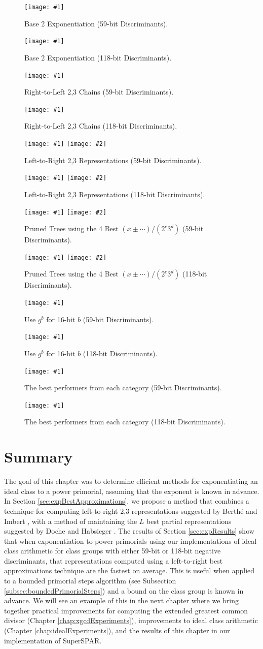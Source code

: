 \documentclass{ucalgthes1}
\theoremstyle{definition}
\newcommand{\mygraph}[3]{
	\begin{figure}[htb]
	\centering
	\texttt{[image: \#1]}
	\caption{#3}
	\label{#2}
	\end{figure}
}
\newcommand{\mygraphTwo}[4]{
	\begin{figure}[htb]
	\centering
	\texttt{[image: \#1]}
	\texttt{[image: \#2]}
	\caption{#4}
	\label{#3}
	\end{figure}
}
\newcommand{\mygraphTwoX}[5]{
	\begin{figure}[htb]
	\centering
	\texttt{[image: \#1]}
	\texttt{[image: \#2]}
	\caption[#5]{#4}
	\label{#3}
	\end{figure}
}
\begin{document}
\mygraph{binary_vs_naf-64}{fig:expBinNaf64}{Base 2 Exponentiation (59-bit Discriminants).}
\mygraph{binary_vs_naf-128}{fig:expBinNaf128}{Base 2 Exponentiation (118-bit Discriminants).}

\mygraph{dbns_r2ls-64}{fig:expDbnsR2L64}{Right-to-Left 2,3 Chains (59-bit Discriminants).}
\mygraph{dbns_r2ls-128}{fig:expDbnsR2L128}{Right-to-Left 2,3 Chains (118-bit Discriminants).}

\mygraphTwo{dbns_l2rs-64}{dbns_l2rs-64-zoom}{fig:expDbnsL2R64}{Left-to-Right 2,3 Representations (59-bit Discriminants).}
\mygraphTwo{dbns_l2rs-128}{dbns_l2rs-128-zoom}{fig:expDbnsL2R128}{Left-to-Right 2,3 Representations (118-bit Discriminants).}

\mygraphTwoX{pm_variants-64}{pm_variants-64-zoom}{fig:expPmVariants64}{Pruned Trees using the 4 Best $(x\pm\cdots)/(2^c3^d)$ (59-bit Discriminants).}{4 Best $(x\pm\cdots)/(2^c3^d)$ (59-bit Discriminants).}
\mygraphTwoX{pm_variants-128}{pm_variants-128-zoom}{fig:expPmVariants128}{Pruned Trees using the 4 Best $(x\pm\cdots)/(2^c3^d)$ (118-bit Discriminants).}{4 Best $(x\pm\cdots)/(2^c3^d)$ (118-bit Discriminants).}

\mygraph{block_vs_list-64}{fig:expBlockList64}{Use $g^b$ for 16-bit $b$ (59-bit Discriminants).}
\mygraph{block_vs_list-128}{fig:expBlockList128}{Use $g^b$ for 16-bit $b$ (118-bit Discriminants).}

\mygraph{winners-64}{fig:expWinners64}{The best performers from each category (59-bit Discriminants).}
\mygraph{winners-128}{fig:expWinners128}{The best performers from each category (118-bit Discriminants).}

\clearpage


\section{Summary}

The goal of this chapter was to determine efficient methods for exponentiating an ideal class to a power primorial, assuming that the exponent is known in advance.  In Section \ref{sec:expBestApproximations}, we propose a method that combines a technique for computing left-to-right 2,3 representations suggested by Berth{\'e} and Imbert \cite{Berthe2009}, with a method of maintaining the $L$ best partial representations suggested by Doche and Habsieger \cite{Doche2008}.  The results of Section \ref{sec:expResults} show that when exponentiation to power primorials using our implementations of ideal class arithmetic for class groups with either 59-bit or 118-bit negative discriminants, that representations computed using a left-to-right best approximations technique are the fastest on average.  This is useful when applied to a bounded primorial steps algorithm (see Subsection \ref{subsec:boundedPrimorialSteps}) and a bound on the class group is known in advance.  We will see an example of this in the next chapter where we bring together practical improvements for computing the extended greatest common divisor (Chapter \ref{chap:xgcdExperiments}), improvements to ideal class arithmetic (Chapter \ref{chap:idealExperiments}), and the results of this chapter in our implementation of SuperSPAR.
\end{document}
